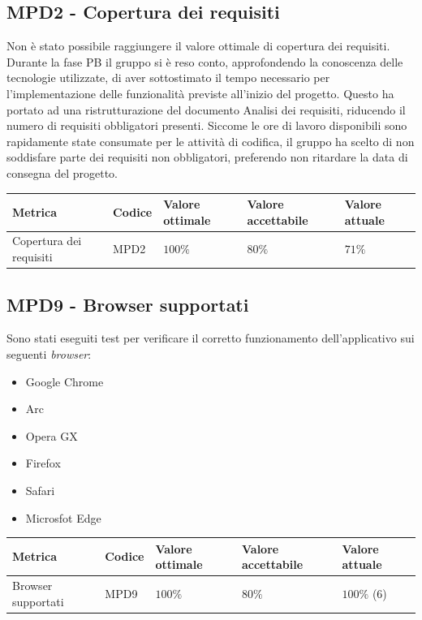 \subsection{MPD2 - Copertura dei requisiti}
Non è stato possibile raggiungere il valore ottimale di copertura dei requisiti.\\
Durante la fase PB il gruppo si è reso conto, approfondendo la conoscenza delle tecnologie utilizzate, di aver sottostimato il tempo necessario per l'implementazione delle funzionalità previste all'inizio del progetto.
Questo ha portato ad una ristrutturazione del documento Analisi dei requisiti, riducendo il numero di requisiti obbligatori presenti.
Siccome le ore di lavoro disponibili sono rapidamente state consumate per le attività di codifica, il gruppo ha scelto di non soddisfare parte dei requisiti non obbligatori, preferendo non ritardare la data di consegna del progetto.
\label{s:mpd2}
\begin{table}[H]
    \centering
    \begin{tabularx}{\textwidth}{X|X|l|l|l}
        \hline
        \textbf{Metrica}        & \textbf{Codice} & \textbf{Valore ottimale} & \textbf{Valore accettabile} & \textbf{Valore attuale} \\
        \hline
        Copertura dei requisiti & MPD2            & $100\%$                  & $80\%$                      & $71\%$                \\
        \hline
    \end{tabularx}
\end{table}


\subsection{MPD9 - Browser supportati}
\label{s:mpd9}
Sono stati eseguiti test per verificare il corretto funzionamento dell'applicativo sui seguenti \textit{browser}:
\begin{itemize}
    \item Google Chrome
    \item Arc
    \item Opera GX
    \item Firefox
    \item Safari
    \item Microsfot Edge
\end{itemize}

\begin{table}[H]
    \centering
    \begin{tabularx}{\textwidth}{X|X|l|l|l}
        \hline
        \textbf{Metrica}   & \textbf{Codice} & \textbf{Valore ottimale} & \textbf{Valore accettabile} & \textbf{Valore attuale} \\
        \hline
        Browser supportati & MPD9            & $100\%$                  & $80\%$                      & $100\%$ (6)               \\
        \hline
    \end{tabularx}
\end{table}
